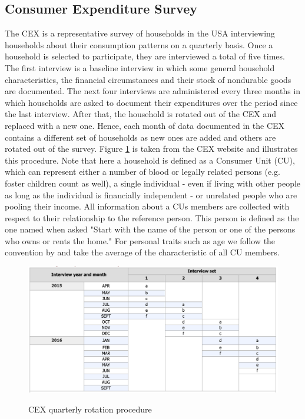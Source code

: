 \subsection{Consumer Expenditure Survey} 
The CEX is a representative survey of households in the USA interviewing households about their consumption patterns on a quarterly basis. Once a household is selected to participate, they are interviewed a total of five times. The first interview is a baseline interview in which some general household characteristics, the financial circumstances and their stock of nondurable goods are documented. The next four interviews are administered every three months in which households are asked to document their expenditures over the period since the last interview. After that, the household is rotated out of the CEX and replaced with a new one. Hence, each month of data documented in the CEX contains a different set of households as new ones are added and others are rotated out of the survey. Figure \ref{fig:cex_rotation} is taken from the CEX website and illustrates this procedure. Note that here a household is defined as a Consumer Unit (CU), which can represent either a number of blood or legally related persons (e.g. foster children count as well), a single individual - even if living with other people as long as the individual is financially independent - or unrelated people who are pooling their income. All information about a CUs members are collected with respect to their relationship to the reference person. This person is defined as the one named when asked "Start with the name of the person or one of the persons who owns or rents the home." For personal traits such as age we follow the convention by \cite{parker_etal_13} and take the average of the characteristic of all CU members. \\ 
\begin{figure}[t]
    \caption{CEX quarterly rotation procedure}
    \centering
    \includegraphics[width=.9\linewidth]{figures/CEX_rotation_table.png}
    \label{fig:cex_rotation}
\end{figure}
